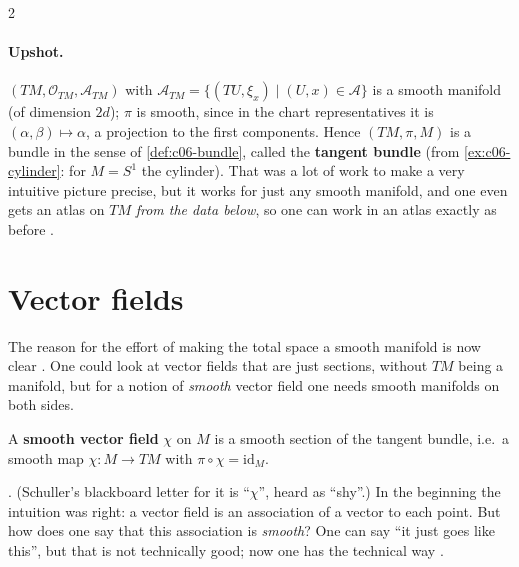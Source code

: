 \begin{paracol}{2}
\paragraph{Upshot.} $(TM,\mathcal O_{TM},\mathcal A_{TM})$ with $\mathcal A_{TM}=\{(TU,\xi_x)\mid(U,x)\in\mathcal A\}$ is a smooth manifold (of dimension $2d$); $\pi$ is smooth, since in the chart representatives it is $(\alpha,\beta)\mapsto\alpha$, a projection to the first components. Hence $(TM,\pi,M)$ is a bundle in the sense of \cref{def:c06-bundle}, called the \textbf{tangent bundle} (from \cref{ex:c06-cylinder}: for $M=S^1$ the cylinder).
That was a lot of work to make a very intuitive picture precise, but it works for just any smooth manifold, and one even gets an atlas on $TM$ \emph{from the data below}, so one can work in an atlas exactly as before .

\section{Vector fields}\label{sec:c06-vectorfields}

The reason for the effort of making the total space a smooth manifold is now clear . One could look at vector fields that are just sections, without $TM$ being a manifold, but for a notion of \emph{smooth} vector field one needs smooth manifolds on both sides.

\begin{definition}\label{def:c06-vf}
A \textbf{smooth vector field} $\chi$ on $M$ is a smooth section of the tangent bundle, i.e.\ a smooth map $\chi\colon M\to TM$ with $\pi\circ\chi=\mathrm{id}_M$.
\end{definition}
. (Schuller's blackboard letter for it is ``$\chi$'', heard as ``shy''.) In the beginning the intuition was right: a vector field is an association of a vector to each point. But how does one say that this association is \emph{smooth}? One can say ``it just goes like this'', but that is not technically good; now one has the technical way
.


\end{paracol}
